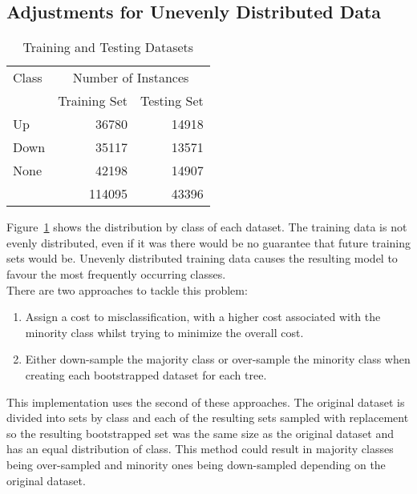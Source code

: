 	\subsection{Adjustments for Unevenly Distributed Data}
			\begin{table}[h]
			\centering
			\begin{tabular}{lrr}
				\toprule
				{Class}		& \multicolumn{2}{c}{Number of Instances}\\
				{}			& \multicolumn{1}{c}{Training Set} & \multicolumn{1}{c}{Testing Set}\\							
				\midrule
				{Up} 		& 36780		& 14918\\
				{Down}		& 35117		& 13571\\
				{None}		& 42198		& 14907\\
				\bottomrule
				{}			& 114095		& 43396\\
			\end{tabular}
			\caption{Training and Testing Datasets}
			\label{tab:trainingAndTestingDatasets}
		\end{table}		
		
		Figure~\ref{tab:trainingAndTestingDatasets} shows the distribution by class of each dataset. The training data is not evenly distributed, even if it was there would be no guarantee that future training sets would be. Unevenly distributed training data causes the resulting model to favour the most frequently occurring classes.\\
		
		There are two approaches to tackle this problem: 
			\begin{enumerate}
				\item Assign a cost to misclassification, with a higher cost associated with the minority class whilst trying to minimize the overall cost.
				\item Either down-sample the majority class or over-sample the minority class when creating each bootstrapped dataset for each tree\cite{chen2004using}.
			\end{enumerate}
			
		This implementation uses the second of these approaches. The original dataset is divided into sets by class and each of the resulting sets sampled with replacement so the resulting bootstrapped set was the same size as the original dataset and has an equal distribution of class. This method could result in majority classes being over-sampled and minority ones being down-sampled depending on the original dataset.\\
		
